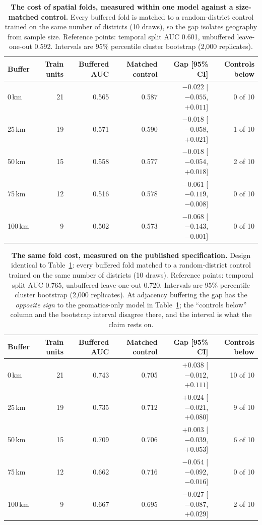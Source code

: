 \begin{table}[htbp]
\centering
\caption{\textbf{The cost of spatial folds, measured within one model against a size-matched control.} Every buffered fold is matched to a random-district control trained on the same number of districts (10 draws), so the gap isolates geography from sample size. Reference points: temporal split AUC 0.601, unbuffered leave-one-out 0.592. Intervals are 95\% percentile cluster bootstrap (2{,}000 replicates).}
\label{tab:wp4-fold}
\begin{tabular}{lrrrrr}
\toprule
Buffer & Train units & Buffered AUC & Matched control & Gap [95\% CI] & Controls below \\
\midrule
0\,km   & 21 & 0.565 & 0.587 & $-0.022$ [$-0.055$, $+0.011$] & 0 of 10 \\
25\,km  & 19 & 0.571 & 0.590 & $-0.018$ [$-0.058$, $+0.021$] & 1 of 10 \\
50\,km  & 15 & 0.558 & 0.577 & $-0.018$ [$-0.054$, $+0.018$] & 2 of 10 \\
75\,km  & 12 & 0.516 & 0.578 & $-0.061$ [$-0.119$, $-0.008$] & 0 of 10 \\
100\,km & 9  & 0.502 & 0.573 & $-0.068$ [$-0.143$, $-0.001$] & 0 of 10 \\
\bottomrule
\end{tabular}
\end{table}

\begin{table}[htbp]
\centering
\caption{\textbf{The same fold cost, measured on the published specification.}\REBUILD{} Design identical to Table~\ref{tab:wp4-fold}: every buffered fold matched to a random-district control trained on the same number of districts (10 draws). Reference points: temporal split AUC 0.765, unbuffered leave-one-out 0.720. Intervals are 95\% percentile cluster bootstrap (2{,}000 replicates). At adjacency buffering the gap has the \emph{opposite sign} to the geomatics-only model in Table~\ref{tab:wp4-fold}; the ``controls below'' column and the bootstrap interval disagree there, and the interval is what the claim rests on.}
\label{tab:wp4-fold-m5}
\begin{tabular}{lrrrrr}
\toprule
Buffer & Train units & Buffered AUC & Matched control & Gap [95\% CI] & Controls below \\
\midrule
0\,km   & 21   & 0.743 & 0.705 & $+0.038$ [$-0.012$, $+0.111$] & 10 of 10 \\
25\,km  & 19   & 0.735 & 0.712 & $+0.024$ [$-0.021$, $+0.080$] & 9 of 10 \\
50\,km  & 15   & 0.709 & 0.706 & $+0.003$ [$-0.039$, $+0.053$] & 6 of 10 \\
75\,km  & 12   & 0.662 & 0.716 & $-0.054$ [$-0.092$, $-0.016$] & 0 of 10 \\
100\,km & 9    & 0.667 & 0.695 & $-0.027$ [$-0.087$, $+0.029$] & 2 of 10 \\
\bottomrule
\end{tabular}
\end{table}

